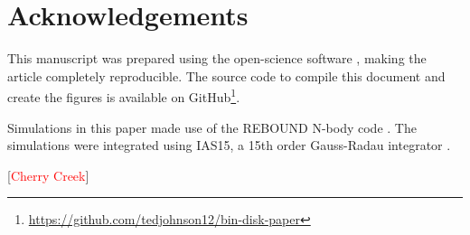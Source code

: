 \documentclass[twocolumn]{aastex631}
\newcommand\ghurl[0]{\url{https://github.com/tedjohnson12/bin-disk-paper}}
\begin{document}
\section{Acknowledgements}
\label{sec:ack}

This manuscript was prepared using the open-science software \href{https://show-your.work/en/latest/intro/}{\showyourwork} \citep{luger2021}, making the article completely
reproducible. The source code to compile this document and create the figures is available on GitHub\footnote{\ghurl}.

Simulations in this paper made use of the REBOUND N-body code \citep{rebound}.
The simulations were integrated using IAS15, a 15th order Gauss-Radau integrator \citep{reboundias15}. 

[\textcolor{red}{Cherry Creek}]


\end{document}
